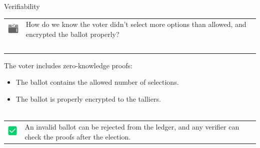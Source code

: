 \documentclass[aspectratio=169]{beamer}
\begin{document}
\begin{frame}{Verifiability}
    \begin{tabular}{>{\arraybackslash}m{40px} >{\arraybackslash}m{320px}}
        \includegraphics[width=30px]{images/ballot.png} & How do we know the voter didn't select more options than allowed, and encrypted the ballot properly? \\~\\
    \end{tabular}

    The voter includes zero-knowledge proofs:
    \begin{itemize}
        \item The ballot contains the allowed number of selections.
        \item The ballot is properly encrypted to the talliers. \\~\\
    \end{itemize}

    \begin{tabular}{>{\arraybackslash}m{40px} >{\arraybackslash}m{320px}}
        \includegraphics[width=30px]{images/check.png} & An invalid ballot can be rejected from the ledger, and any verifier can check the proofs after the election. \\
    \end{tabular}
\end{frame}
\end{document}
